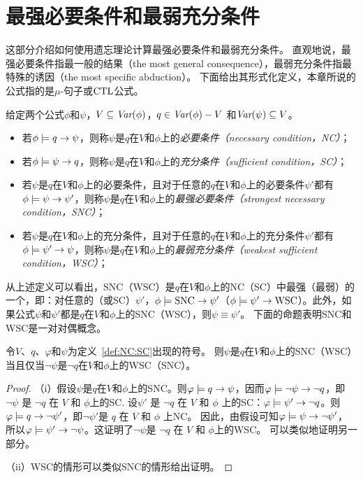\section{最强必要条件和最弱充分条件}\label{chapter07:sec:snc}
这部分介绍如何使用遗忘理论计算最强必要条件和最弱充分条件。
直观地说，最强必要条件指最一般的结果（the most general consequence），最弱充分条件指最特殊的诱因（the most specific abduction）。
下面给出其形式化定义，本章所说的公式指的是$\mu$-句子或$\textrm{CTL}$公式。
\begin{definition}[充分和必要条件]\label{def:NC:SC}
	给定两个公式$\phi$和$\psi$，$V \subseteq \textit{Var}(\phi)$，$q\in\textit{Var}(\phi)- V$
	和$\textit{Var}(\psi)\subseteq V$。
	\begin{itemize}
		\item 若$\phi \models q \rightarrow \psi$，则称$\psi$是$q$在$V$和$\phi$上的{\em 必要条件（necessary condition，NC）}；
		\item 若$\phi \models \psi\rightarrow q$，则称$\psi$是$q$在$V$和$\phi$上的{\em 充分条件（sufficient condition，SC）}；
		\item 若$\psi$是$q$在$V$和$\phi$上的必要条件，且对于任意的$q$在$V$和$\phi$上的必要条件$\psi'$都有$\phi\models\psi\rightarrow\psi'$，则称$\psi$是$q$在$V$和$\phi$上的{\em 最强必要条件（strongest necessary condition，SNC）}；
		\item 若$\psi$是$q$在$V$和$\phi$上的充分条件，且对于任意的$q$在$V$和$\phi$上的充分条件$\psi'$都有$\phi\models\psi'\rightarrow\psi$，则称$\psi$是$q$在$V$和$\phi$上的{\em 最弱充分条件（weakest sufficient condition，WSC）}；
	\end{itemize}
\end{definition}

从上述定义可以看出，SNC（WSC）是$q$在$V$和$\phi$上的NC（SC）中最强（最弱）的一个，即：对任意的（或SC）$\psi'$，$\phi \models \hbox{SNC} \rightarrow \psi'$（$\phi \models \psi' \rightarrow \hbox{WSC}$）。此外，如果公式$\psi$和$\psi'$都是$q$在$V$和$\phi$上的SNC（WSC），则$\psi \equiv \psi'$。
下面的命题表明SNC和WSC是一对对偶概念。

\begin{proposition}[对偶性]\label{dual}
	令$V$、$q$、$\varphi$和$\psi$为定义~\ref{def:NC:SC}出现的符号。
	则$\psi$是$q$在$V$和$\phi$上的SNC（WSC）当且仅当$\neg \psi$是$\neg q$在$V$和$\phi$上的WSC（SNC）。
\end{proposition}
\begin{proof}
	（i）假设$\psi$是$q$在$V$和$\phi$上的SNC。则$\varphi \models q \rightarrow \psi$，因而$\varphi \models \neg \psi \rightarrow \neg q$，即 $\neg \psi$ 是 $\neg q$ 在 $V$ 和 $\phi$上的SC. 设$\psi'$ 是 $\neg q$ 在 $V$ 和 $\phi$ 上的SC：$\varphi \models \psi' \rightarrow \neg q$。则$\varphi \models q \rightarrow \neg \psi'$，即$\neg \psi'$是 $q$ 在 $V$ 和 $\phi$ 上NC。
	因此，由假设可知$\varphi \models \psi \rightarrow \neg \psi'$，所以$\varphi \models \psi' \rightarrow \neg \psi$。这证明了$\neg \psi$是 $\neg q$ 在 $V$ 和 $\phi$上的WSC。
可以类似地证明另一部分。
	
	（ii）WSC的情形可以类似SNC的情形给出证明。
\end{proof}

